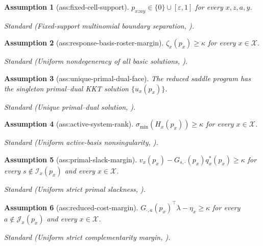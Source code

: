 \documentclass{article}
\newtheorem{assumption}{Assumption}
\begin{document}
\begin{assumption}[ass:fixed-cell-support]\label{ass:fixed-cell-support}
\(p_{xzay}\in\{0\}\cup[\varepsilon,1]\) for every \(x,z,a,y\).
\par\smallskip\noindent\emph{Standard} (Fixed-support multinomial boundary separation, \cite{KlattMunkZemel2022RandomLP}).
\end{assumption}

\begin{assumption}[ass:response-basis-roster-margin]\label{ass:response-basis-roster-margin}
\(\zeta_x(p_x)\geq\kappa\) for every \(x\in\mathcal X\).
\par\smallskip\noindent\emph{Standard} (Uniform nondegeneracy of all basic solutions, \cite{BonnansShapiro2000Perturbation}).
\end{assumption}

\begin{assumption}[ass:unique-primal-dual-face]\label{ass:unique-primal-dual-face}
The reduced saddle program has the singleton primal--dual KKT solution \(\{u_x(p_x)\}\).
\par\smallskip\noindent\emph{Standard} (Unique primal--dual solution, \cite{BonnansShapiro2000Perturbation}).
\end{assumption}

\begin{assumption}[ass:active-system-rank]\label{ass:active-system-rank}
\(\sigma_{\min}(H_x(p_x))\geq\kappa\) for every \(x\in\mathcal X\).
\par\smallskip\noindent\emph{Standard} (Uniform active-basis nonsingularity, \cite{BonnansShapiro2000Perturbation}).
\end{assumption}

\begin{assumption}[ass:primal-slack-margin]\label{ass:primal-slack-margin}
\(v_x(p_x)-G_{s,\cdot}(p_x)q_x^*(p_x)\geq\kappa\) for every \(s\notin\mathcal I_x(p_x)\) and every \(x\in\mathcal X\).
\par\smallskip\noindent\emph{Standard} (Uniform strict primal slackness, \cite{BonnansShapiro2000Perturbation}).
\end{assumption}

\begin{assumption}[ass:reduced-cost-margin]\label{ass:reduced-cost-margin}
\(G_{\cdot,a}(p_x)^\top\lambda-\eta_x\geq\kappa\) for every \(a\notin\mathcal J_x(p_x)\) and every \(x\in\mathcal X\).
\par\smallskip\noindent\emph{Standard} (Uniform strict complementarity margin, \cite{BonnansShapiro2000Perturbation}).
\end{assumption}
\end{document}
